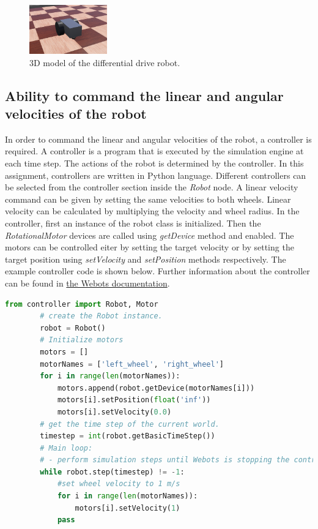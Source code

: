 \documentclass[11pt]{article}
\begin{document}
    \begin{figure}[ht!]
        \centering
        \includegraphics[width = 0.3\textwidth]{3d-model.PNG}
        \caption{3D model of the differential drive robot.}
        \label{fig:model}
    \end{figure}
    
    \subsection{Ability to command the linear and angular velocities of the robot}    
    In order to command the linear and angular velocities of the robot, a controller is required. A controller is a program that is executed by 
    the simulation engine at each time step. The actions of the robot is determined by the controller. In this assignment, controllers are written 
    in Python language.  Different controllers can be selected from the controller section inside the \emph{Robot} node.
    A linear velocity command can be given by setting the same velocities to both wheels. Linear velocity can be calculated by 
    multiplying the velocity and wheel radius. In the controller, first an 
    instance of the robot class is initialized. Then the \emph{RotationalMotor} devices are called using \emph{getDevice} method and enabled. The motors
    can be controlled eiter by setting the target velocity or by setting the target position using \emph{setVelocity} and \emph{setPosition} methods respectively.
    The example controller code is shown below. Further information about the controller can be found in \href{https://cyberbotics.com/doc/guide/controller-programming?tab-language=python}{the Webots documentation}.

    \begin{lstlisting}[language=Python]
        from controller import Robot, Motor
        # create the Robot instance.
        robot = Robot()
        # Initialize motors 
        motors = []
        motorNames = ['left_wheel', 'right_wheel']
        for i in range(len(motorNames)):
            motors.append(robot.getDevice(motorNames[i]))
            motors[i].setPosition(float('inf'))
            motors[i].setVelocity(0.0)
        # get the time step of the current world.
        timestep = int(robot.getBasicTimeStep())
        # Main loop:
        # - perform simulation steps until Webots is stopping the controller
        while robot.step(timestep) != -1:
            #set wheel velocity to 1 m/s
            for i in range(len(motorNames)):
                motors[i].setVelocity(1)   
            pass
    \end{lstlisting}
\end{document}
